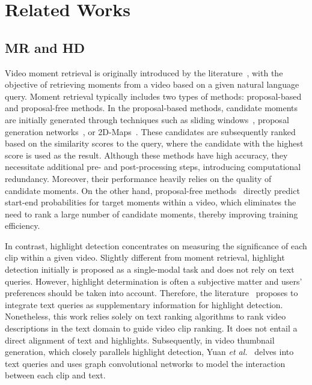 \section{Related Works}
\subsection{MR and HD}

Video moment retrieval is originally introduced by the literature~\cite{gao2017tall}, with the objective of retrieving moments from a video based on a given natural language query. Moment retrieval typically includes two types of methods: proposal-based and proposal-free methods. In the proposal-based methods, candidate moments are initially generated through techniques such as sliding windows~\cite{gao2017tall}, proposal generation networks~\cite{xu2019multilevel}, or 2D-Maps~\cite{zhang2020learning}. These candidates are subsequently ranked based on the similarity scores to the query, where the candidate with the highest score is used as the result. Although these methods have high accuracy, they necessitate additional pre- and post-processing steps, introducing computational redundancy. Moreover, their performance heavily relies on the quality of candidate moments. On the other hand, proposal-free methods~\cite{ghosh2019excl, zhang2021natural,mun2020local} directly predict start-end probabilities for target moments within a video, which eliminates the need to rank a large number of candidate moments, thereby improving training efficiency.

In contrast, highlight detection concentrates on measuring the significance of each clip within a given video. Slightly different from moment retrieval, highlight detection initially is proposed as a single-modal task and does not rely on text queries. However, highlight determination is often a subjective matter and users' preferences should be taken into account. Therefore, the literature~\cite{kudi2017words} proposes to integrate text queries as supplementary information for highlight detection. Nonetheless, this work relies solely on text ranking algorithms to rank video descriptions in the text domain to guide video clip ranking. It does not entail a direct alignment of text and highlights. Subsequently, in video thumbnail generation, which closely parallels highlight detection, Yuan \emph{et al.}~\cite{DBLP:conf/mm/YuanM019} delves into text queries and uses graph convolutional networks to model the interaction between each clip and text.

